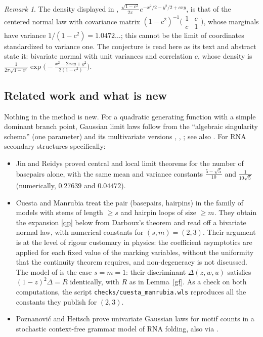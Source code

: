 \documentclass[11pt]{amsart}
\theoremstyle{remark}
\newtheorem{remark}[theorem]{Remark}
\begin{document}
\begin{remark}
The density displayed in \cite{BKZ}, $\frac{\sqrt{1-c^2}}{2\pi}e^{-x^2/2-y^2/2+cxy}$, is that of the centered
normal law with covariance matrix $(1-c^2)^{-1}\bigl(\begin{smallmatrix}1&c\\c&1\end{smallmatrix}\bigr)$, whose
marginals have variance $1/(1-c^2)=1.0472\ldots$; this cannot be the limit of coordinates standardized to
variance one. The conjecture is read here as its text and abstract state it: bivariate normal with unit variances and
correlation $c$, whose density is
$\frac{1}{2\pi\sqrt{1-c^2}}\exp\bigl(-\frac{x^2-2cxy+y^2}{2(1-c^2)}\bigr)$.
\end{remark}

\subsection*{Related work and what is new}
Nothing in the method is new. For a quadratic generating function with a simple dominant branch point, Gaussian
limit laws follow from the ``algebraic singularity schema'' \cite[Thm.~IX.12]{FS} (one parameter) and its
multivariate versions \cite{BR,GR}, \cite[Thm.~2.25]{D}, \cite{HK}; see also \cite[\S IX.12 (multivariate limit laws)]{FS}.
For RNA secondary structures specifically:
\begin{itemize}
\item Jin and Reidys \cite{JR} proved central and local limit theorems for the number of basepairs alone, with the
same mean and variance constants $\tfrac{5-\sqrt5}{10}$ and $\tfrac1{10\sqrt5}$ (numerically, $0.27639$ and $0.04472$).
\item Cuesta and Manrubia \cite[\S3.3]{CM} treat the pair (basepairs, hairpins) in the family of models with stems
of length $\ge s$ and hairpin loops of size $\ge m$. They obtain the expansion \eqref{qp} below from Darboux's
theorem and read off a bivariate normal law, with numerical constants for $(s,m)=(2,3)$. Their argument is at the
level of rigour customary in physics: the coefficient asymptotics are applied for each fixed value of the marking
variables, without the uniformity that the continuity theorem requires, and non-degeneracy is not discussed. The
model of \cite{BKZ} is the case $s=m=1$: their discriminant $\Delta(z,w,u)$ satisfies $(1-z)^2\Delta=R$ identically,
with $R$ as in Lemma~\ref{gf}. As a check on both computations, the script \texttt{checks/cuesta\_manrubia.wls} reproduces all the
constants they publish for $(2,3)$.
\item Poznanovi\'c and Heitsch \cite{PH} prove univariate Gaussian laws for motif counts in a stochastic context-free
grammar model of RNA folding, also via \cite[Thm.~IX.12]{FS}.
\end{itemize}
\end{document}
